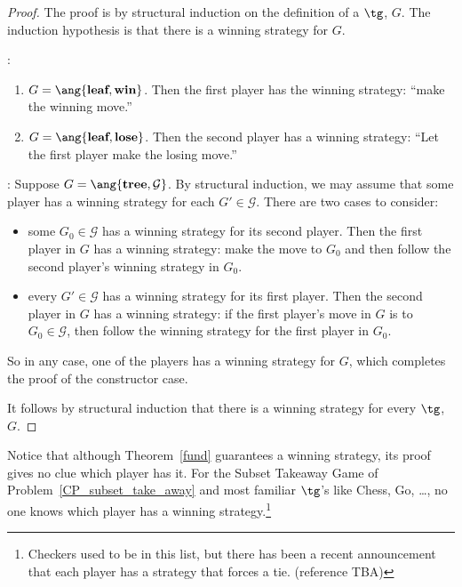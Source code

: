 \begin{definition}
\begin{proof}
The proof is by structural induction on the definition of a $\tg$, $G$.
The induction hypothesis is that there is a winning strategy for $G$.

:
\begin{enumerate}

\item $G=\ang{\textbf{leaf}, \textbf{win}}$.  Then the first player has the
 winning strategy: ``make the winning move.''

\item $G=\ang{\textbf{leaf}, \textbf{lose}}$.  Then the second player has a
 winning strategy: ``Let the first player make the losing move.''
\end{enumerate}

: Suppose $G = \ang{\textbf{tree},\mathcal{G}}$.
By structural induction, we may assume that some player has a winning
strategy for each $G' \in \mathcal{G}$.  There are two cases to consider:
\begin{itemize}
\item some $G_0 \in \mathcal{G}$ has a winning strategy for its second
  player.  Then the first player in $G$ has a winning strategy: make the
  move to $G_0$ and then follow the second player's winning strategy in
  $G_0$.

\item every $G' \in \mathcal{G}$ has a winning strategy for its first
  player.  Then the second player in $G$ has a winning strategy: if the
  first player's move in $G$ is to $G_0 \in \mathcal{G}$, then follow the
  winning strategy for the first player in $G_0$.
\end{itemize}
So in any case, one of the players has a winning strategy for $G$, which
completes the proof of the constructor case.

It follows by structural induction that there is a winning strategy for
every $\tg$, $G$.
\end{proof}

Notice that although Theorem~\ref{fund} guarantees a winning strategy, its
proof gives no clue which player has it.  For the Subset Takeaway Game of
Problem~\ref{CP_subset_take_away} and most familiar $\tg$'s like Chess,
Go, \dots, no one knows which player has a winning
strategy.\footnote{Checkers used to be in this list, but there has been a
  recent announcement that each player has a strategy that forces a tie.
  (reference TBA)}


\end{definition}
